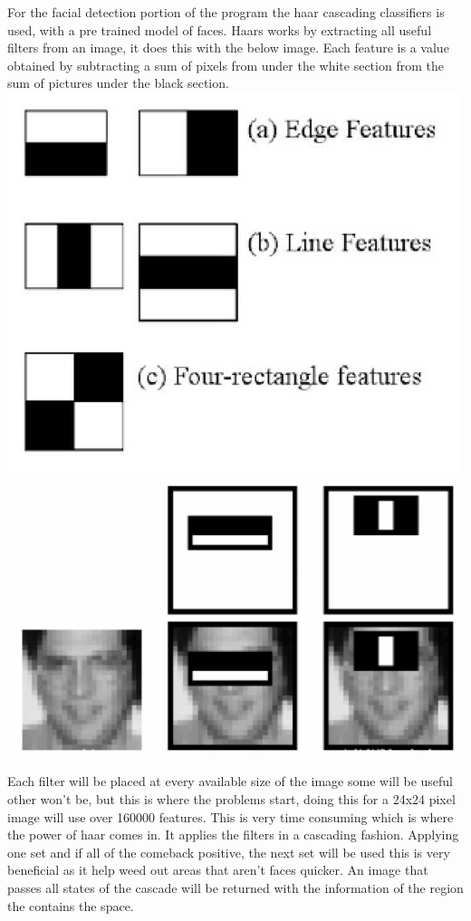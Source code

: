 \documentclass[
  english,
  a4paper,
,tablecaptionabove
]{scrartcl}
\begin{document}
For the facial detection portion of the program the haar cascading
classifiers is used, with a pre trained model of faces. Haars works by
extracting all useful filters from an image, it does this with the below
image. Each feature is a value obtained by subtracting a sum of pixels
from under the white section from the sum of pictures under the black
section. \includegraphics{images/ppm-images/camera-algorithm1.png}
\includegraphics{images/ppm-images/camera-algorithm2.png}

Each filter will be placed at every available size of the image some
will be useful other won't be, but this is where the problems start,
doing this for a 24x24 pixel image will use over 160000 features. This
is very time consuming which is where the power of haar comes in. It
applies the filters in a cascading fashion. Applying one set and if all
of the comeback positive, the next set will be used this is very
beneficial as it help weed out areas that aren't faces quicker. An image
that passes all states of the cascade will be returned with the
information of the region the contains the space.
\end{document}
